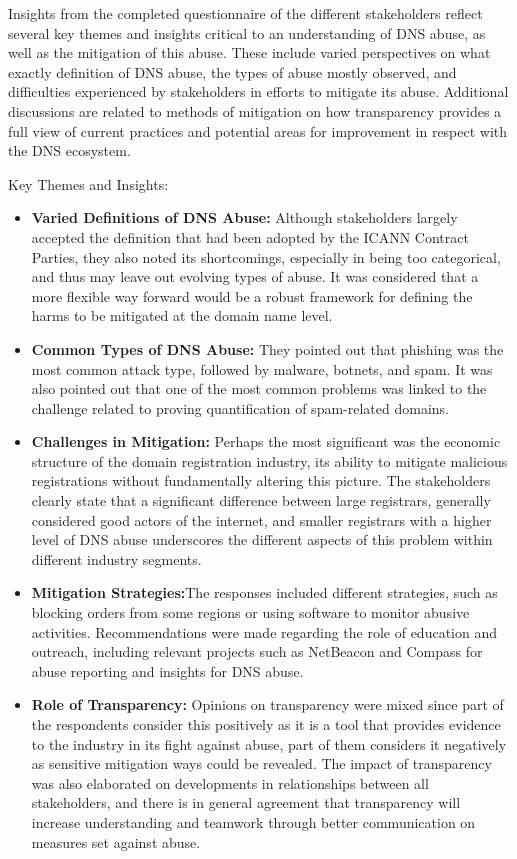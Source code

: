 Insights from the completed questionnaire of the different stakeholders reflect several key themes and insights critical to an understanding of DNS abuse, as well as the mitigation of this abuse. These include varied perspectives on what exactly definition of DNS abuse, the types of abuse mostly observed, and difficulties experienced by stakeholders in efforts to mitigate its abuse. Additional discussions are related to methods of mitigation on how transparency provides a full view of current practices and potential areas for improvement in respect with the DNS ecosystem.

Key Themes and Insights:

\begin{itemize}
  \item \textbf{Varied Definitions of DNS Abuse:} Although stakeholders largely accepted the definition that had been adopted by the ICANN Contract Parties, they also noted its shortcomings, especially in being too categorical, and thus may leave out evolving types of abuse. It was considered that a more flexible way forward would be a robust framework for defining the harms to be mitigated at the domain name level.
  
  \item \textbf{Common Types of DNS Abuse:} They pointed out that phishing was the most common attack type, followed by malware, botnets, and spam. It was also pointed out that one of the most common problems was linked to the challenge related to proving quantification of spam-related domains.
  
  \item \textbf{Challenges in Mitigation:} Perhaps the most significant was the economic structure of the domain registration industry, its ability to mitigate malicious registrations without fundamentally altering this picture. The stakeholders clearly state that a significant difference between large registrars, generally considered good actors of the internet, and smaller registrars with a higher level of DNS abuse underscores the different aspects of this problem within different industry segments.
  
  \item \textbf{Mitigation Strategies:}The responses included different strategies, such as blocking orders from some regions or using software to monitor abusive activities. Recommendations were made regarding the role of education and outreach, including relevant projects such as NetBeacon and Compass for abuse reporting and insights for DNS abuse.
  \item \textbf{Role of Transparency:} Opinions on transparency were mixed since part of the respondents consider this positively as it is a tool that provides evidence to the industry in its fight against abuse, part of them considers it negatively as sensitive mitigation ways could be revealed. The impact of transparency was also elaborated on developments in relationships between all stakeholders, and there is in general agreement that transparency will increase understanding and teamwork through better communication on measures set against abuse.
  
\end{itemize}

